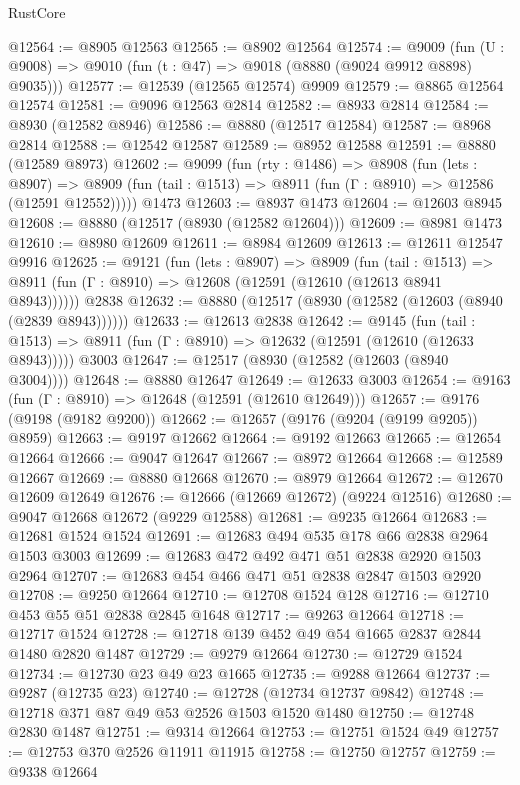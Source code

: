 \begin{lexlean}{RustCore}
\begin{coremodule}
@12564 := @8905 @12563
@12565 := @8902 @12564
@12574 := @9009
    (fun (U : @9008) => @9010 (fun (t : @47) => @9018 (@8880 (@9024 @9912 @8898) @9035)))
@12577 := @12539 (@12565 @12574) @9909
@12579 := @8865 @12564 @12574
@12581 := @9096 @12563 @2814
@12582 := @8933 @2814
@12584 := @8930 (@12582 @8946)
@12586 := @8880 (@12517 @12584)
@12587 := @8968 @2814
@12588 := @12542 @12587
@12589 := @8952 @12588
@12591 := @8880 (@12589 @8973)
@12602 := @9099
    (fun (rty : @1486) =>
    @8908
      (fun (lets : @8907) =>
      @8909 (fun (tail : @1513) => @8911 (fun (Γ : @8910) => @12586 (@12591 @12552)))))
    @1473
@12603 := @8937 @1473
@12604 := @12603 @8945
@12608 := @8880 (@12517 (@8930 (@12582 @12604)))
@12609 := @8981 @1473
@12610 := @8980 @12609
@12611 := @8984 @12609
@12613 := @12611 @12547 @9916
@12625 := @9121
    (fun (lets : @8907) =>
    @8909
      (fun (tail : @1513) =>
      @8911 (fun (Γ : @8910) => @12608 (@12591 (@12610 (@12613 @8941 @8943))))))
    @2838
@12632 := @8880 (@12517 (@8930 (@12582 (@12603 (@8940 (@2839 @8943))))))
@12633 := @12613 @2838
@12642 := @9145
    (fun (tail : @1513) => @8911 (fun (Γ : @8910) => @12632 (@12591 (@12610 (@12633 @8943)))))
    @3003
@12647 := @12517 (@8930 (@12582 (@12603 (@8940 @3004))))
@12648 := @8880 @12647
@12649 := @12633 @3003
@12654 := @9163 (fun (Γ : @8910) => @12648 (@12591 (@12610 @12649)))
@12657 := @9176 (@9198 (@9182 @9200))
@12662 := @12657 (@9176 (@9204 (@9199 @9205)) @8959)
@12663 := @9197 @12662
@12664 := @9192 @12663
@12665 := @12654 @12664
@12666 := @9047 @12647
@12667 := @8972 @12664
@12668 := @12589 @12667
@12669 := @8880 @12668
@12670 := @8979 @12664
@12672 := @12670 @12609 @12649
@12676 := @12666 (@12669 @12672) (@9224 @12516)
@12680 := @9047 @12668 @12672 (@9229 @12588)
@12681 := @9235 @12664
@12683 := @12681 @1524 @1524
@12691 := @12683 @494 @535 @178 @66 @2838 @2964 @1503 @3003
@12699 := @12683 @472 @492 @471 @51 @2838 @2920 @1503 @2964
@12707 := @12683 @454 @466 @471 @51 @2838 @2847 @1503 @2920
@12708 := @9250 @12664
@12710 := @12708 @1524 @128
@12716 := @12710 @453 @55 @51 @2838 @2845 @1648
@12717 := @9263 @12664
@12718 := @12717 @1524
@12728 := @12718 @139 @452 @49 @54 @1665 @2837 @2844 @1480 @2820 @1487
@12729 := @9279 @12664
@12730 := @12729 @1524
@12734 := @12730 @23 @49 @23 @1665
@12735 := @9288 @12664
@12737 := @9287 (@12735 @23)
@12740 := @12728 (@12734 @12737 @9842)
@12748 := @12718 @371 @87 @49 @53 @2526 @1503 @1520 @1480
@12750 := @12748 @2830 @1487
@12751 := @9314 @12664
@12753 := @12751 @1524 @49
@12757 := @12753 @370 @2526 @11911 @11915
@12758 := @12750 @12757
@12759 := @9338 @12664

\end{coremodule}
\end{lexlean}
